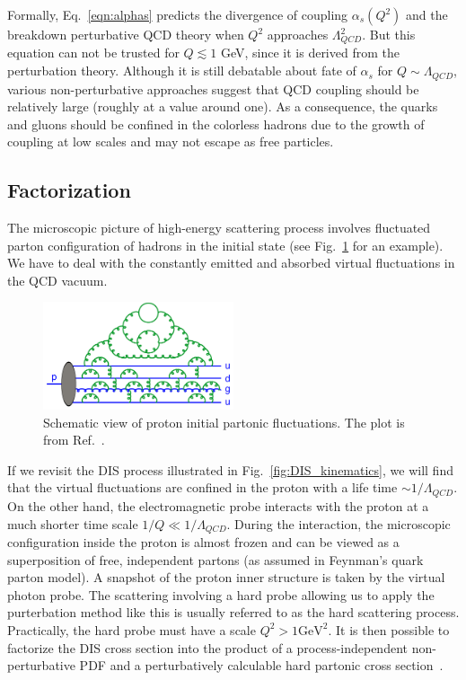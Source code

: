 Formally, Eq.~\ref{eqn:alphas} predicts the divergence of coupling
$\alpha_{s}(Q^{2})$ and the breakdown perturbative QCD theory when $Q^{2}$
approaches $\Lambda^{2}_{QCD}$. But this equation can not be trusted for
$Q\lesssim 1$ GeV, since it is derived from the perturbation theory. Although it
is still debatable about fate of $\alpha_{s}$ for $Q\sim\Lambda_{QCD}$, various
non-perturbative approaches suggest that QCD coupling should be relatively large
(roughly at a value around one). As a consequence, the quarks and gluons should
be confined in the colorless hadrons due to the growth of coupling at low scales
and may not escape as free particles.


\subsection{Factorization}
The microscopic picture of high-energy scattering process involves fluctuated
parton configuration of hadrons in the initial state (see
Fig.~\ref{fig:hadron_config} for an example). We have to deal with the
constantly emitted and absorbed virtual fluctuations in the QCD vacuum. 

\begin{figure}
\centering
\includegraphics[width=0.5\textwidth]{plots/chpt2/hadron_initial_state.png}
\caption[proton initial state parton configurations] {
Schematic view of proton initial partonic fluctuations. The plot is from Ref.~\cite{Skands:2012ts}. }
\label{fig:hadron_config}
\end{figure}

If we revisit the DIS process illustrated in Fig.~\ref{fig:DIS_kinematics}, we
will find that the virtual fluctuations are confined in the proton with a life
time $\sim 1/\Lambda_{QCD}$. On the other hand, the electromagnetic probe
interacts with the proton at a much shorter time scale $1/Q \ll
1/\Lambda_{QCD}$. During the interaction, the microscopic configuration inside
the proton is almost frozen and can be viewed as a superposition of free,
independent partons (as assumed in Feynman's quark parton model). A snapshot of
the proton inner structure is taken by the virtual photon probe. The scattering
involving a hard probe allowing us to apply the purterbation method like this is
usually referred to as the hard scattering process. Practically, the hard probe
must have a scale $Q^{2}>1 \mathrm{GeV}^{2}$. It is then possible to factorize
the DIS cross section into the product of a process-independent non-perturbative
PDF and a perturbatively calculable hard partonic cross
section~\cite{Sterman:1995fz}.

